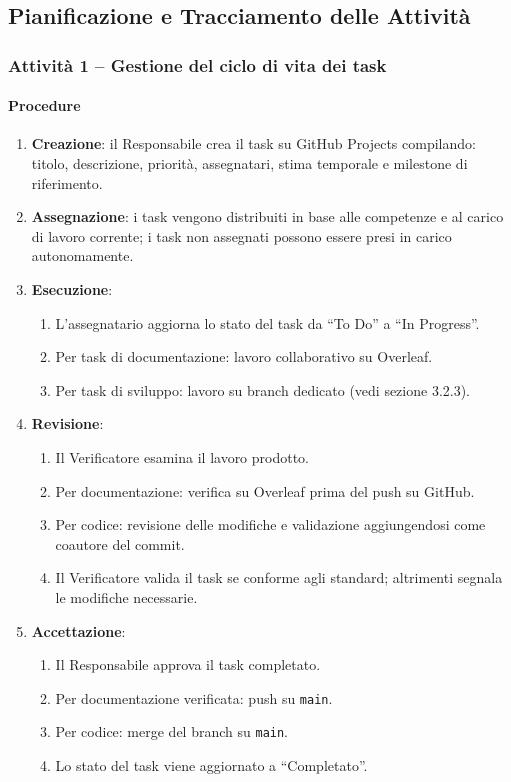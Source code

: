 \documentclass[a4paper, 11pt, oneside]{scrartcl}
\begin{document}
\subsection{Pianificazione e Tracciamento delle Attività}

\subsubsection{Attività 1 – Gestione del ciclo di vita dei task}

\paragraph{Procedure}
\begin{enumerate}
    \item \textbf{Creazione}: il Responsabile crea il task su GitHub Projects compilando: titolo, descrizione, priorità, assegnatari, stima temporale e milestone{\scriptsize{}} di riferimento.
    \item \textbf{Assegnazione}: i task vengono distribuiti in base alle competenze e al carico di lavoro corrente; i task non assegnati possono essere presi in carico autonomamente.
    \item \textbf{Esecuzione}:
          \begin{enumerate}[label=\alph*.]
              \item L'assegnatario aggiorna lo stato del task da ``To Do'' a ``In Progress''.
              \item Per task di documentazione: lavoro collaborativo su Overleaf.
              \item Per task di sviluppo: lavoro su branch dedicato (vedi sezione 3.2.3).
          \end{enumerate}
    \item \textbf{Revisione}:
          \begin{enumerate}[label=\alph*.]
              \item Il Verificatore esamina il lavoro prodotto.
              \item Per documentazione: verifica su Overleaf prima del push su GitHub.
              \item Per codice: revisione delle modifiche e validazione aggiungendosi come coautore del commit.
              \item Il Verificatore valida il task se conforme agli standard; altrimenti segnala le modifiche necessarie.
          \end{enumerate}
    \item \textbf{Accettazione}:
          \begin{enumerate}[label=\alph*.]
              \item Il Responsabile approva il task completato.
              \item Per documentazione verificata: push su \texttt{main}.
              \item Per codice: merge del branch su \texttt{main}.
              \item Lo stato del task viene aggiornato a ``Completato''.
          \end{enumerate}
\end{enumerate}
\end{document}
